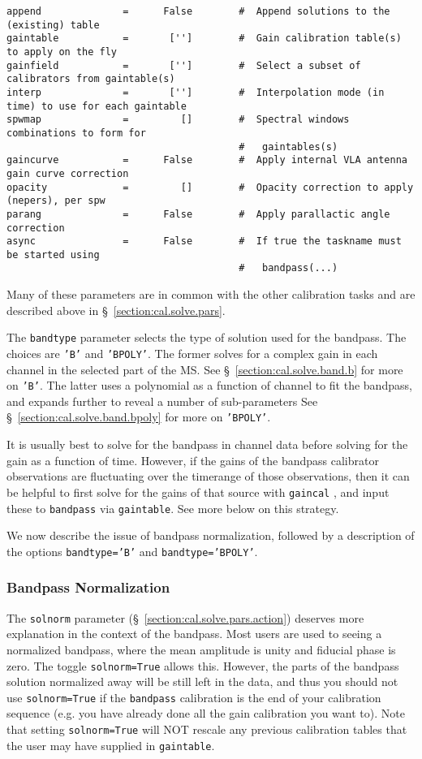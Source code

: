 {\begin{verbatim}
append              =      False        #  Append solutions to the (existing) table
gaintable           =       ['']        #  Gain calibration table(s) to apply on the fly
gainfield           =       ['']        #  Select a subset of calibrators from gaintable(s)
interp              =       ['']        #  Interpolation mode (in time) to use for each gaintable
spwmap              =         []        #  Spectral windows combinations to form for
                                        #   gaintables(s)
gaincurve           =      False        #  Apply internal VLA antenna gain curve correction
opacity             =         []        #  Opacity correction to apply (nepers), per spw
parang              =      False        #  Apply parallactic angle correction
async               =      False        #  If true the taskname must be started using
                                        #   bandpass(...)
\end{verbatim}
\normalsize
Many of these parameters are in common with the other calibration
tasks and are described above in \S~\ref{section:cal.solve.pars}.

The {\tt bandtype} parameter selects the type of solution used for the
bandpass.  The choices are {\tt 'B'} and {\tt 'BPOLY'}.  The former 
solves for a complex gain in each channel in the selected part of the
MS. See \S~\ref{section:cal.solve.band.b} for more on {\tt 'B'}.
The latter uses a polynomial as a function of channel to fit the
bandpass, and expands further to reveal a number of sub-parameters
See \S~\ref{section:cal.solve.band.bpoly} for more on {\tt 'BPOLY'}.

It is usually best to solve for the bandpass in channel data before
solving for the gain as a function of time.  However, if the gains of
the bandpass calibrator observations are fluctuating over the
timerange of those observations, then it can be helpful to first solve
for the gains of that source with {\tt gaincal} , and input these to
{\tt bandpass} via {\tt gaintable}.  See more below on this strategy.

We now describe the issue of bandpass normalization, followed by
a description of the options {\tt bandtype='B'} and {\tt bandtype='BPOLY'}.

\subsubsection{Bandpass Normalization}
\label{section:cal.solve.band.solnorm}

The {\tt solnorm} parameter (\S~\ref{section:cal.solve.pars.action})
deserves more explanation in the context of the bandpass.  Most users
are used to seeing a normalized bandpass, where the mean amplitude
is unity and fiducial phase is zero. 
The toggle {\tt solnorm=True} allows this.  However, the parts of the
bandpass solution normalized away will be still left in the data,
and thus you should not use {\tt solnorm=True} if the {\tt bandpass}
calibration is the end of your calibration sequence (e.g. you have
already done all the gain calibration you want to).  Note that
setting {\tt solnorm=True} will NOT rescale any previous calibration
tables that the user may have supplied in {\tt gaintable}.

}
